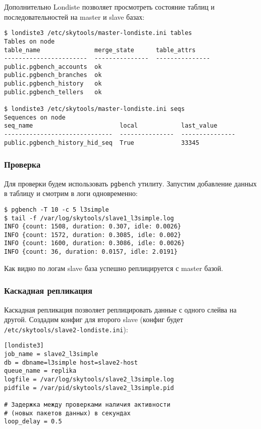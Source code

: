 Дополнительно Londiste позволяет просмотреть состояние таблиц и последовательностей на master и slave базах:

\begin{lstlisting}[label=lst:londiste-replica17,caption=Статус таблиц и последовательностей]
$ londiste3 /etc/skytools/master-londiste.ini tables
Tables on node
table_name               merge_state      table_attrs
-----------------------  ---------------  ---------------
public.pgbench_accounts  ok
public.pgbench_branches  ok
public.pgbench_history   ok
public.pgbench_tellers   ok

$ londiste3 /etc/skytools/master-londiste.ini seqs
Sequences on node
seq_name                        local            last_value
------------------------------  ---------------  ---------------
public.pgbench_history_hid_seq  True             33345
\end{lstlisting}



\subsubsection{Проверка}

Для проверки будем использовать \lstinline!pgbench! утилиту. Запустим добавление данных в таблицу и смотрим в логи одновременно:

\begin{lstlisting}[label=lst:londiste-check1,caption=Проверка]
$ pgbench -T 10 -c 5 l3simple
$ tail -f /var/log/skytools/slave1_l3simple.log
INFO {count: 1508, duration: 0.307, idle: 0.0026}
INFO {count: 1572, duration: 0.3085, idle: 0.002}
INFO {count: 1600, duration: 0.3086, idle: 0.0026}
INFO {count: 36, duration: 0.0157, idle: 2.0191}
\end{lstlisting}

Как видно по логам slave база успешно реплицируется с master базой.


\subsubsection{Каскадная репликация}

Каскадная репликация позволяет реплицировать данные с одного слейва на другой. Создадим конфиг для второго slave (конфиг будет \lstinline!/etc/skytools/slave2-londiste.ini!):

\begin{lstlisting}[label=lst:londiste-cascade1,caption=Конфиг для slave2]
[londiste3]
job_name = slave2_l3simple
db = dbname=l3simple host=slave2-host
queue_name = replika
logfile = /var/log/skytools/slave2_l3simple.log
pidfile = /var/pid/skytools/slave2_l3simple.pid

# Задержка между проверками наличия активности
# (новых пакетов данных) в секундах
loop_delay = 0.5
\end{lstlisting}

